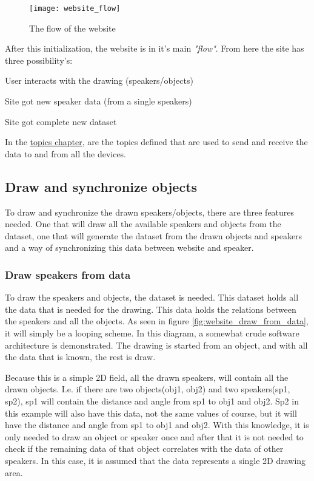 \begin{figure}[H]
    \centering
    \texttt{[image: website\_flow]}
    \caption{The flow of the website}
    \label{fig:website_flow}
\end{figure}

After this initialization, the website is in it's main \textit{"flow"}. From here the site has three possibility's:
\begin{shortlist}
    \item User interacts with the drawing (speakers/objects)
    \item Site got new speaker data (from a single speakers)
    \item Site got complete new dataset
\end{shortlist}
In the \hyperref[chap:Topics]{topics chapter}, are the topics defined that are used to send and receive the data to and from all the devices.

\subsection{Draw and synchronize objects}
To draw and synchronize the drawn speakers/objects, there are three features needed.
One that will draw all the available speakers and objects from the dataset,
one that will generate the dataset from the drawn objects and speakers
and a way of synchronizing this data between website and speaker.

\subsubsection{Draw speakers from data}
To draw the speakers and objects, the dataset is needed. This dataset holds all the data that is needed for the drawing.
This data holds the relations between the speakers and all the objects.
As seen in figure \ref{fig:website_draw_from_data}, it will simply be a looping scheme.
In this diagram, a somewhat crude software architecture is demonstrated.
The drawing is started from an object, and with all the data that is known, the rest is draw.

Because this is a simple 2D field, all the drawn speakers, will contain all the drawn objects.
I.e. if there are two objects(obj1, obj2) and two speakers(sp1, sp2), sp1 will contain the distance and angle from sp1 to obj1 and obj2.
Sp2 in this example will also have this data, not the same values of course, but it will have the distance and angle from sp1 to obj1 and obj2.
With this knowledge, it is only needed to draw an object or speaker once and after that it is not needed to check if the remaining data of that object correlates with the data of other speakers.
In this case, it is assumed that the data represents a single 2D drawing area.

